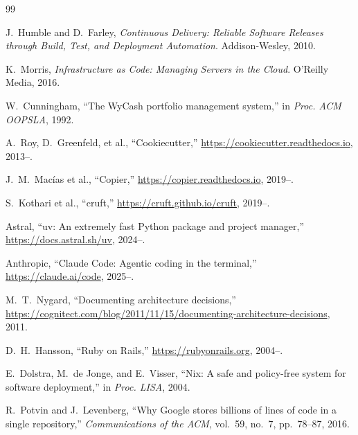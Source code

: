 \documentclass[12pt,a4paper]{article}
\begin{document}

\begin{thebibliography}{99}

J.~Humble and D.~Farley, \textit{Continuous Delivery: Reliable Software Releases through Build, Test, and Deployment Automation}. Addison-Wesley, 2010.

K.~Morris, \textit{Infrastructure as Code: Managing Servers in the Cloud}. O'Reilly Media, 2016.

W.~Cunningham, ``The WyCash portfolio management system,'' in \textit{Proc. ACM OOPSLA}, 1992.

A.~Roy, D.~Greenfeld, et al., ``Cookiecutter,'' \url{https://cookiecutter.readthedocs.io}, 2013--.

J.~M.~Macías et al., ``Copier,'' \url{https://copier.readthedocs.io}, 2019--.

S.~Kothari et al., ``cruft,'' \url{https://cruft.github.io/cruft}, 2019--.

Astral, ``uv: An extremely fast Python package and project manager,'' \url{https://docs.astral.sh/uv}, 2024--.

Anthropic, ``Claude Code: Agentic coding in the terminal,'' \url{https://claude.ai/code}, 2025--.

M.~T.~Nygard, ``Documenting architecture decisions,'' \url{https://cognitect.com/blog/2011/11/15/documenting-architecture-decisions}, 2011.

D.~H.~Hansson, ``Ruby on Rails,'' \url{https://rubyonrails.org}, 2004--.

E.~Dolstra, M.~de Jonge, and E.~Visser, ``Nix: A safe and policy-free system for software deployment,'' in \textit{Proc. LISA}, 2004.

R.~Potvin and J.~Levenberg, ``Why Google stores billions of lines of code in a single repository,'' \textit{Communications of the ACM}, vol.~59, no.~7, pp.~78--87, 2016.

\end{thebibliography}
\end{document}
